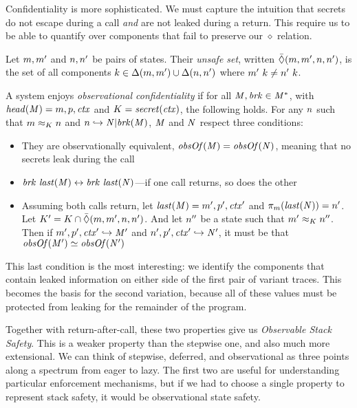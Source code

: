 \documentclass[acmsmall,review,anonymous]{acmart}\settopmatter{printfolios=true,printccs=false,printacmref=false}
\begin{document}
{\medskip

Confidentiality is more sophisticated. We must capture the intuition that
secrets do not escape during a call {\em and} are not leaked during a return.
This require us to be able to quantify over components that fail to preserve
our \(\diamond\) relation.

 Let \(m,m'\) and \(n,n'\)
be pairs of states. Their {\em unsafe set}, written
\(\bar{\Diamond}(m,m',n,n')\), is the set of all components
\(k \in \Delta(m,m') \cup \Delta(n,n')\) where
\(m' ~ k \not = n' ~ k\).

A system enjoys {\em observational confidentiality} if for all
\(\mathit{M},\mathit{brk} \in \mathit{M}^*\), with \(\mathit{head}(\mathit{M}) = m,p,\mathit{ctx}\) and
\(K = \mathit{secret}(\mathit{ctx})\), the following holds.
%
For any \(n\) such that \(m \approx_K n\) and
\(n \hookrightarrow \mathit{N} | \mathit{brk}(\mathit{M})\),
\(\mathit{M}\) and \(\mathit{N}\) respect three conditions:

\begin{itemize}
\item They are observationally equivalent, \(\mathit{obsOf}(\mathit{M}) = \mathit{obsOf}(\mathit{N})\),
  meaning that no secrets leak during the call
\item \(\mathit{brk} ~ \mathit{last}(\mathit{M}) \leftrightarrow \mathit{brk} ~
\mathit{last}(\mathit{N})\)---if one call returns, so does the other
\item Assuming both calls return, let \(\mathit{last}(\mathit{M}) = m',p',\mathit{ctx}'\)
  and \(\pi_m(\mathit{last}(\mathit{N})) = n'\).
  Let \(K' = K \cap \bar{\Diamond}(m,m',n,n')\).
  And let \(n''\) be a state such that \(m' \approx_K n''\).
  Then if \(m',p',\mathit{ctx}' \hookrightarrow \mathit{M}'\) and
  \(n',p',\mathit{ctx}' \hookrightarrow \mathit{N}'\), it must be
  that \(\mathit{obsOf}(\mathit{M}') \simeq \mathit{obsOf}(\mathit{N}')\)
\end{itemize}

This last condition is the most interesting: we identify the components that
contain leaked information on either side of the first pair of variant traces.
This becomes the basis for the second variation, because all of these values
must be protected from leaking for the remainder of the program.

Together with return-after-call, these two properties give us
{\em Observable Stack Safety}. This is a weaker property
than the stepwise one, and also much more extensional.
We can think of stepwise, deferred, and observational as
three points along a spectrum from eager to lazy. The first two
are useful for understanding particular enforcement mechanisms,
but if we had to choose a single property to represent stack safety,
it would be observational state safety.

}
\end{document}
